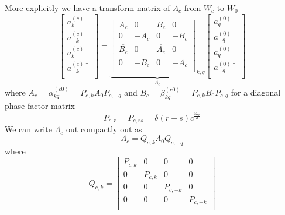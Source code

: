 \documentclass[12pt,a4paper]{article}
\begin{document}
More explicitly we have a transform matrix of $\Lambda_c$ from $W_c$ to $W_0$ 
\begin{equation}
  \left[ \begin{array}{l}
    a^{(c)}_k \\
    a^{(c)}_{-k} \\
    \hline
    a^{(c)\dagger}_k \\
    a^{(c)\dagger}_{-k} \\
 \end{array} \right] = \underbrace{
  \left[
\begin{array}{rr|rr}
    A_c        &       0   &  B_c            &  0 \\
    0        &      -A_c   &  0            & -B_c \\
    \hline
    \overline{B_c}        &    0      &  \overline{A_c} & 0 \\
    0 &    -\overline{B_c}      &   0           & -\overline{A_c} \\
\end{array} \right]_{k,q} }_{\Lambda_c}
  \left[ \begin{array}{l}
    a^{(0)}_q \\
    a^{(0)}_{-q} \\
    \hline
    a^{(0)\dagger}_q \\
    a^{(0)\dagger}_{-q} \\
 \end{array} \right]
\end{equation}
where $A_c = \alpha_{kq}^{(c0)} = P_{c,k} A_0 P_{c,-q}$  and $B_c = \beta_{kq}^{(c0)} = P_{c,k} B_0 P_{c,q}$ for a diagonal phase factor matrix
\begin{equation}
  P_{c,r} = P_{c,rs} = \delta(r - s) c^{\frac{i\omega_r}{a}}
\end{equation}
We can write $\Lambda_c$ out compactly out as
\begin{equation}
  \Lambda_c = Q_{c,k} \Lambda_0 Q_{c,-q}
\end{equation}
where
\begin{equation}
  Q_{c,k} = \left[\begin{array}{cccc}
        P_{c,k} & 0 & 0 & 0 \\
        0 & P_{c,k} & 0 & 0 \\
        0 & 0 & P_{c,-k} & 0 \\
        0 & 0 & 0 & P_{c,-k} \\
\end{array} \right] 
\end{equation}
\end{document}
